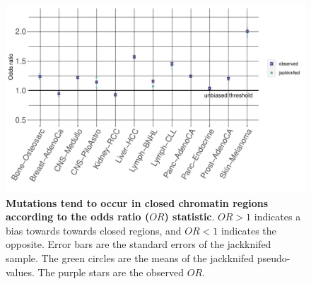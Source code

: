 \begin{figure}[h!]
    \centering
    \includegraphics[scale=0.8]{graphics/jackknife_OR.pdf}
    \caption{\textbf{Mutations tend to occur in closed chromatin regions according to the odds ratio ($OR$) statistic}. $OR>1$ indicates a bias towards towards closed regions, and $OR<1$ indicates the opposite. Error bars are the standard errors of the jackknifed sample. The green circles are the means of the jackknifed pseudo-values. The purple stars are the observed $OR$.}
    \label{fig:or_jackknifed}
\end{figure}
